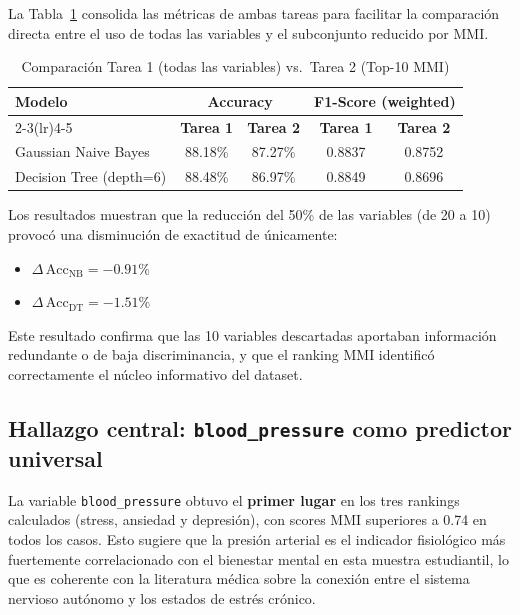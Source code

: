 \documentclass[12pt, letterpaper]{article}
\begin{document}
La Tabla~\ref{tab:comparacion} consolida las métricas de ambas tareas para
facilitar la comparación directa entre el uso de todas las variables y el
subconjunto reducido por MMI.

\begin{table}[H]
    \centering
    \caption{Comparación Tarea 1 (todas las variables) vs.\ Tarea 2 (Top-10 MMI)}
    \label{tab:comparacion}
    \begin{tabular}{lcccc}
        \toprule
        \multirow{2}{*}{\textbf{Modelo}} &
        \multicolumn{2}{c}{\textbf{Accuracy}} &
        \multicolumn{2}{c}{\textbf{F1-Score (weighted)}} \\
        \cmidrule(lr){2-3}\cmidrule(lr){4-5}
        & \textbf{Tarea 1} & \textbf{Tarea 2} &
          \textbf{Tarea 1} & \textbf{Tarea 2} \\
        \midrule
        \rowcolor{rowgray}
        Gaussian Naive Bayes     & 88.18\% & 87.27\% & 0.8837 & 0.8752 \\
        Decision Tree (depth=6)  & 88.48\% & 86.97\% & 0.8849 & 0.8696 \\
        \bottomrule
    \end{tabular}
\end{table}

Los resultados muestran que la reducción del 50\% de las variables
(de 20 a 10) provocó una disminución de exactitud de únicamente:

\begin{itemize}
    \item $\Delta\,\text{Acc}_{\text{NB}} = -0.91\%$
    \item $\Delta\,\text{Acc}_{\text{DT}} = -1.51\%$
\end{itemize}

Este resultado confirma que las 10 variables descartadas aportaban
información redundante o de baja discriminancia, y que el ranking
MMI identificó correctamente el núcleo informativo del dataset.

\subsection{Hallazgo central: \texttt{blood\_pressure} como predictor universal}

La variable \texttt{blood\_pressure} obtuvo el \textbf{primer lugar} en los
tres rankings calculados (stress, ansiedad y depresión), con scores MMI
superiores a 0.74 en todos los casos. Esto sugiere que la presión arterial
es el indicador fisiológico más fuertemente correlacionado con el bienestar
mental en esta muestra estudiantil, lo que es coherente con la literatura
médica sobre la conexión entre el sistema nervioso autónomo y los estados
de estrés crónico.
\end{document}
